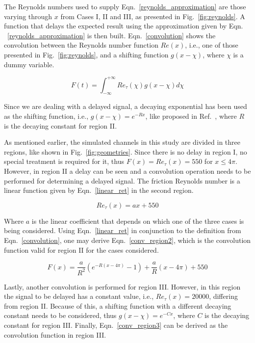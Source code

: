 \documentclass[twocolumn,10pt]{asme2e}
\begin{document}
The Reynolds numbers used to supply Eqn.~\ref{reynolds_approximation} are those varying through \(x\) from Cases I, II and III, as presented in Fig.~\ref{fig:reynolds}. A function that delays the expected result using the approximation given by Eqn. ~\ref{reynolds_approximation} is then built. Eqn.~\ref{convolution} shows the convolution between the Reynolds number function \(Re(x)\), i.e., one of those presented in Fig.~\ref{fig:reynolds}, and a shifting function \(g(x-\chi)\), where \(\chi\) is a dummy variable.

\begin{equation}
F(t) =  \int_{-\infty}^{+\infty} Re_{\tau}(\chi)g(x-\chi)d\chi
\label{convolution}
\end{equation}

Since we are dealing with a delayed signal, a decaying exponential has been used as the shifting function, i.e., \(g(x-\chi)=e^{-Rx}\), like proposed in Ref.~\cite{signals}, where \(R\) is the decaying constant for region II.

As mentioned earlier, the simulated channels in this study are divided in three regions, like shown in Fig.~\ref{fig:geometries}. Since there is no delay in region I, no special treatment is required for it, thus \(F(x)=Re_{\tau}(x)=550\) for \(x{\leq}4\pi\). However, in region II a delay can be seen and a convolution operation needs to be performed for determining a delayed signal. The friction Reynolds number is a linear function given by Eqn.~\ref{linear_ret} in the second region.

\begin{equation}
Re_{\tau}(x)=ax+550
\label{linear_ret}
\end{equation}

Where \(a\) is the linear coefficient that depends on which one of the three cases is being considered. Using Eqn.~\ref{linear_ret} in conjunction to the definition from Eqn.~\ref{convolution}, one may derive Eqn.~\ref{conv_region2}, which is the convolution function valid for region II for the cases considered.

\begin{equation}
F(x)= \frac{a}{R^2}(e^{-R(x-4{\pi})}-1)+\frac{a}{R}(x-4{\pi})+550
\label{conv_region2}
\end{equation}

Lastly, another convolution is performed for region III. However, in this region the signal to be delayed has a constant value, i.e., \(Re_{\tau}(x)=20000\), differing from region II. Because of this, a shifting function with a different decaying constant needs to be considered, thus \(g(x-\chi)=e^{-Cx}\), where \(C\) is the decaying constant for region III. Finally, Eqn.~\ref{conv_region3} can be derived as the convolution function in region III.
\end{document}
